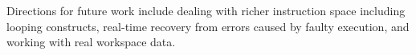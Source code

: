 %
%
Directions for future work include dealing with richer instruction space including looping constructs, real-time recovery from errors caused by faulty execution, and working with real workspace data.